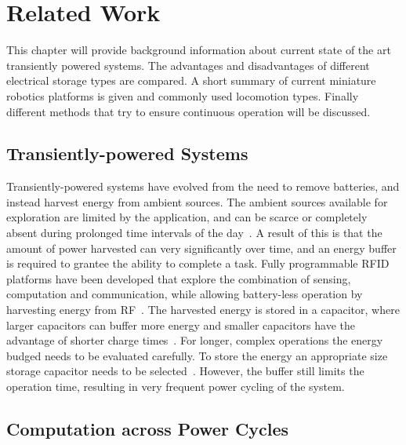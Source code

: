 \chapter{Related Work}
\label{chp:related_work}

This chapter will provide background information about current state of the art transiently powered systems. The advantages and disadvantages of different electrical storage types are compared. A short summary of current miniature robotics platforms is given and commonly used locomotion types. Finally different methods that try to ensure continuous operation will be discussed.

\section{Transiently-powered Systems}
\label{sec:tp_systems}

Transiently-powered systems have evolved from the need to remove batteries, and instead harvest energy from ambient sources.
The ambient sources available for exploration are limited by the application, and can be scarce or completely absent during prolonged time intervals of the day~\cite{konstantopoulos_im_2016}.
A result of this is that the amount of power harvested can very significantly over time, and an energy buffer is required to grantee the ability to complete a task.
Fully programmable RFID platforms have been developed that explore the combination of sensing, computation and communication, while allowing battery-less operation by harvesting energy from RF~\cite{sample_transim_2008}. 
The harvested energy is stored in a capacitor, where larger capacitors can buffer more energy and smaller capacitors have the advantage of shorter charge times~\cite{gummerson_mobisys_2010}.
For longer, complex operations the energy budged needs to be evaluated carefully.
To store the energy an appropriate size storage capacitor needs to be selected~\cite{naderiparizi_rfid_2015}.
However, the buffer still limits the operation time, resulting in very frequent power cycling of the system.

\section{Computation across Power Cycles}
\label{sec:comp_pc} 

